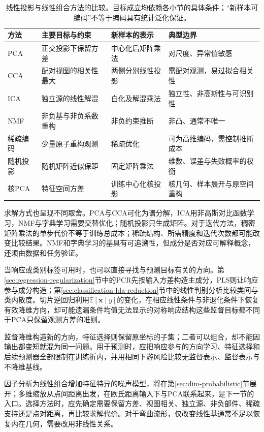 \begin{table}[htbp]
  \centering
  \small
  \begin{tabularx}{\linewidth}{@{}l>{\RaggedRight\arraybackslash}X>{\RaggedRight\arraybackslash}X>{\RaggedRight\arraybackslash}X@{}}
    \toprule
    方法 & 主要目标与约束 & 新样本的表示 & 典型边界\\
    \midrule
    PCA & 正交投影下保留方差 & 中心化后矩阵乘法 & 对尺度、异常值敏感\\
    CCA & 配对视图的相关性最大 & 两侧分别线性投影 & 需配对观测，易过拟合相关性\\
    ICA & 独立源的线性解混 & 白化及解混乘法 & 独立性、非高斯性与可识别性\\
    NMF & 非负基与非负系数重构 & 非负约束推断 & 非凸、通常不唯一\\
    稀疏编码 & 少量原子重构观测 & 稀疏优化 & 可为高维编码，需控制推断成本\\
    随机投影 & 随机矩阵近似保距 & 固定矩阵乘法 & 维数、误差与失败概率的权衡\\
    核PCA & 特征空间方差 & 训练中心化核投影 & 核几何、样本展开与原空间重构\\
    \bottomrule
  \end{tabularx}
  \caption{线性投影与线性组合方法的比较。目标成立均依赖各小节的具体条件；“新样本可编码”不等于编码具有统计泛化保证。}
  \label{tab:dim-linear-comparison}
\end{table}

求解方式也呈现不同取舍。PCA与CCA可化为谱分解，ICA用非高斯对比函数学习，NMF与字典学习需要交替优化；随机投影只生成矩阵。对于迭代方法，稠密矩阵乘法的单步代价不等于训练总成本；稀疏结构、所需精度和迭代次数都可能改变比较结果。NMF和字典学习的基具有可追溯性，但成分是否对应可解释概念，还须由数据和任务验证。

当响应或类别标签可用时，也可以直接寻找与预测目标有关的方向。第\ref{sec:regression-regularization}节中的PCR先按输入方差构造主成分，PLS则让响应参与成分构造；第\ref{sec:classification-lda-reduction}节中的线性判别分析比较类间与类内散度。切片逆回归利用$\mathbb{E}[\bm{x}\mid y]$的变化，在相应线性条件与非退化条件下恢复有效降维方向，却可能遗漏条件均值无法显示的对称响应结构这些监督目标都不同于PCA只保留观测方差的准则。

监督降维构造新的方向，特征选择则保留原坐标的子集；二者可以组合，却不能因输出都变短就混为同一问题。用于预测时，应把响应参与的方向学习、特征选择和后续预测器全部限制在训练折内，并用相同下游风险比较无监督表示、监督表示与不降维基线。

因子分析为线性组合增加特征特异的噪声模型，将在第\ref{sec:dim-probabilistic}节展开；多维缩放从点间距离出发，在欧氏距离输入下与PCA联系起来，是下一节的入口。选择方法时，应先确定需要保留方差、视图相关、独立源、非负部件、稀疏支持还是点对距离，再比较求解代价。对于弯曲流形，仅改变线性基通常不足以恢复内在几何，需要改用非线性关系。


